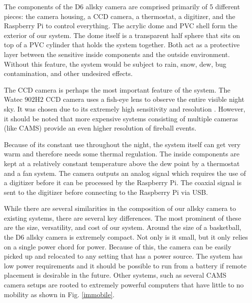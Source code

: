 The components of the D6 allsky camera are comprised primarily of 5 different pieces: the camera housing, a CCD camera, a thermostat, a digitizer, and the Raspberry Pi to control everything.
The acrylic dome and PVC shell form the exterior of our system. 
The dome itself is a transparent half sphere that sits on top of a PVC cylinder that holds the system together.
Both act as a protective layer between the sensitive inside components and the outside environment.  
Without this feature, the system would be subject to rain, snow, dew, bug contamination, and other undesired effects.

The CCD camera is perhaps the most important feature of the system.
The Watec $902$H$2$ CCD camera uses a fish-eye lens to observe the entire visible night sky.
It was chosen due to its extremely high sensitivity and resolution \cite{noauthor_wat-902h2_nodate}.
However, it should be noted that more expensive systems consisting of multiple cameras (like CAMS) provide an even higher resolution of fireball events.

Because of its constant use throughout the night, the system itself can get very warm and therefore needs some thermal regulation.
The inside components are kept at a relatively constant temperature above the dew point by a thermostat and a fan system.
The camera outputs an analog signal which requires the use of a digitizer before it can be processed by the Raspberry Pi.
The coaxial signal is sent to the digitizer before connecting to the Raspberry Pi via USB.

While there are several similarities in the composition of our allsky camera to existing systems, there are several key differences.
The most prominent of these are the size, versatility, and cost of our system.
Around the size of a basketball, the D6 allsky camera is extremely compact.  
Not only is it small, but it only relies on a single power chord for power.  
Because of this, the camera can be easily picked up and relocated to any setting that has a power source.  
The system has low power requirements and it should be possible to run from a battery if remote placement is desirable in the future.
Other systems, such as several CAMS camera setups are rooted to extremely powerful computers that have little to no mobility as shown in Fig. \ref{immobile}.


